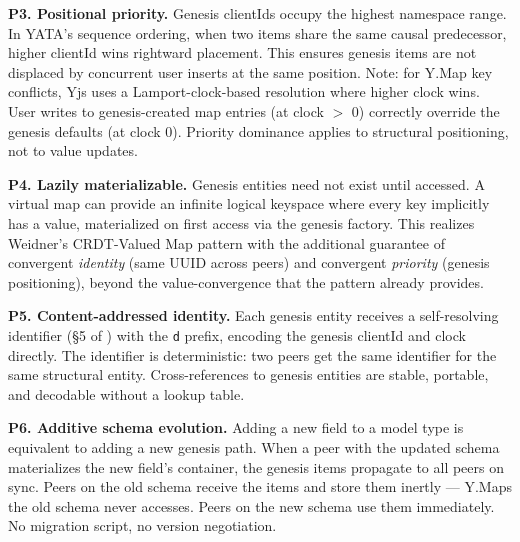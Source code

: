 \textbf{P3. Positional priority.} Genesis clientIds occupy the highest namespace range\cite{plexus:partitioning}. In YATA's sequence ordering, when two items share the same causal predecessor, higher clientId wins rightward placement. This ensures genesis items are not displaced by concurrent user inserts at the same position. Note: for Y.Map key conflicts, Yjs uses a Lamport-clock-based resolution where higher clock wins. User writes to genesis-created map entries (at clock $>$ 0) correctly override the genesis defaults (at clock 0). Priority dominance applies to structural positioning, not to value updates.

\textbf{P4. Lazily materializable.} Genesis entities need not exist until accessed. A virtual map can provide an infinite logical keyspace where every key implicitly has a value, materialized on first access via the genesis factory. This realizes Weidner's CRDT-Valued Map pattern\cite{weidner2022collab} with the additional guarantee of convergent \emph{identity} (same UUID across peers) and convergent \emph{priority} (genesis positioning), beyond the value-convergence that the pattern already provides.

\textbf{P5. Content-addressed identity.} Each genesis entity receives a self-resolving identifier (\S5 of \cite{plexus:arch}) with the \texttt{d} prefix, encoding the genesis clientId and clock directly. The identifier is deterministic: two peers get the same identifier for the same structural entity. Cross-references to genesis entities are stable, portable, and decodable without a lookup table.

\textbf{P6. Additive schema evolution.} Adding a new field to a model type is equivalent to adding a new genesis path. When a peer with the updated schema materializes the new field's container, the genesis items propagate to all peers on sync. Peers on the old schema receive the items and store them inertly --- Y.Maps the old schema never accesses. Peers on the new schema use them immediately. No migration script, no version negotiation.

